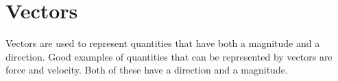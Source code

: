 \documentclass[10pt,reqno]{book}
\title{\myfont{Calculus III}}
\author{Lukas Zamora}
\date{November 28, 2017}
\theoremstyle{definition}
\begin{document}
	\maketitle

	\tableofcontents

	\chapter{Vectors}

	Vectors are used to represent quantities that have both a magnitude and a direction.  Good examples of quantities that can be represented by vectors are force and velocity.  Both of these have a direction and a magnitude.
\end{document}
